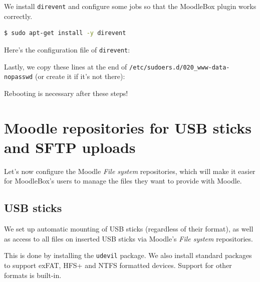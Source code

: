 \documentclass[12pt]{article}
\begin{document}
We install \lstinline{direvent} and configure some jobs so that the MoodleBox plugin works correctly.
\begin{lstlisting}[language=bash]
$ sudo apt-get install -y direvent
\end{lstlisting}
Here's the configuration file of \lstinline{direvent}:


Lastly, we copy these lines at the end of \lstinline{/etc/sudoers.d/020_www-data-nopasswd} (or create it if it's not there):


Rebooting is necessary after these steps!

\section{Moodle repositories for USB sticks and SFTP uploads}

Let's now configure the Moodle \textsl{File system} repositories, which will make it easier for MoodleBox's users to manage the files they want to provide with Moodle.

\subsection{USB sticks}

We set up automatic mounting of USB sticks (regardless of their format), as well as access to all files on inserted USB sticks via Moodle's \textsl{File system} repositories.

This is done by installing the \lstinline{udevil} package.
We also install standard packages to support exFAT, HFS+ and NTFS formatted devices.
Support for other formats is built-in.
\end{document}

